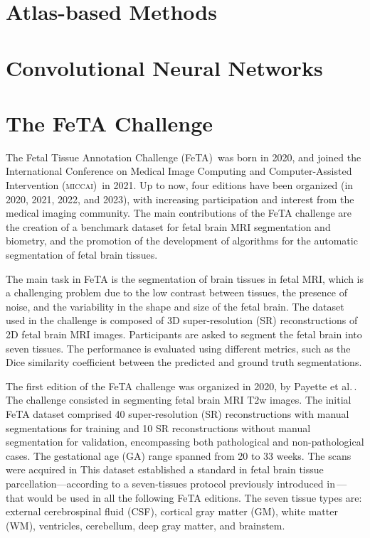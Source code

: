 \section{Atlas-based Methods}

\section{Convolutional Neural Networks}

\section{The FeTA Challenge}
The Fetal Tissue Annotation Challenge (FeTA)\,\cite{FeTA2024} was born in 2020, and joined the International Conference on Medical Image Computing and Computer-Assisted Intervention (\textsc{miccai})\,\cite{MICCAI} in 2021. Up to now, four editions have been organized (in 2020, 2021, 2022, and 2023), with increasing participation and interest from the medical imaging community. The main contributions of the FeTA challenge are the creation of a benchmark dataset for fetal brain MRI segmentation and biometry, and the promotion of the development of algorithms for the automatic segmentation of fetal brain tissues.

The main task in FeTA is the segmentation of brain tissues in fetal MRI, which is a challenging problem due to the low contrast between tissues, the presence of noise, and the variability in the shape and size of the fetal brain. The dataset used in the challenge is composed of 3D super-resolution (SR) reconstructions of 2D fetal brain MRI images. Participants are asked to segment the fetal brain into seven tissues. The performance is evaluated using different metrics, such as the Dice similarity coefficient between the predicted and ground truth segmentations.\,\cite{FeTA2024_paper}

The first edition of the FeTA challenge was organized in 2020, by Payette et al.\,\cite{FeTA2020_review}. The challenge consisted in segmenting fetal brain MRI T2w images. The initial FeTA dataset comprised 40 super-resolution (SR) reconstructions with manual segmentations for training and 10 SR reconstructions without manual segmentation for validation, encompassing both pathological and non-pathological cases. The gestational age (GA) range spanned from 20 to 33 weeks. The scans were acquired in This dataset established a standard in fetal brain tissue parcellation---according to a seven-tissues protocol previously introduced in\,\cite{Payette2020}---that would be used in all the following FeTA editions. The seven tissue types are: external cerebrospinal fluid (CSF), cortical gray matter (GM), white matter (WM), ventricles, cerebellum, deep gray matter, and brainstem.

